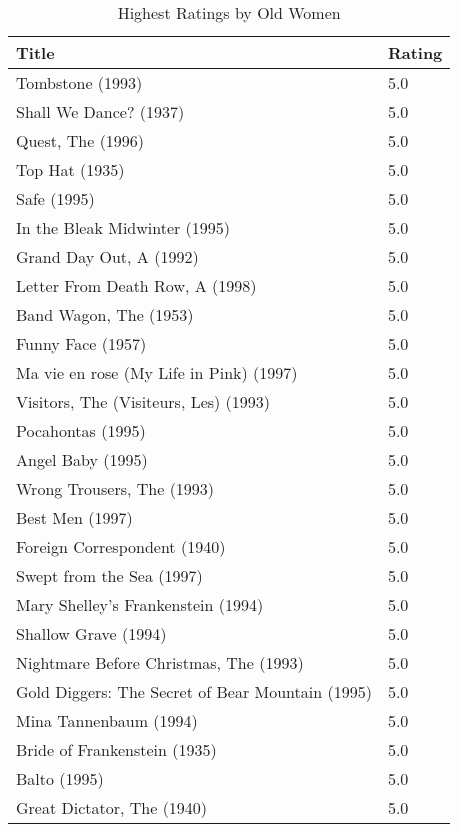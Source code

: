 \begin{table}[h!]
\centering
\begin{tabular}{| l | l |}
\hline
Title & Rating \\
\hline
Tombstone (1993) & 5.0 \\
Shall We Dance? (1937) & 5.0 \\
Quest, The (1996) & 5.0 \\
Top Hat (1935) & 5.0 \\
Safe (1995) & 5.0 \\
In the Bleak Midwinter (1995) & 5.0 \\
Grand Day Out, A (1992) & 5.0 \\
Letter From Death Row, A (1998) & 5.0 \\
Band Wagon, The (1953) & 5.0 \\
Funny Face (1957) & 5.0 \\
Ma vie en rose (My Life in Pink) (1997) & 5.0 \\
Visitors, The (Visiteurs, Les) (1993) & 5.0 \\
Pocahontas (1995) & 5.0 \\
Angel Baby (1995) & 5.0 \\
Wrong Trousers, The (1993) & 5.0 \\
Best Men (1997) & 5.0 \\
Foreign Correspondent (1940) & 5.0 \\
Swept from the Sea (1997) & 5.0 \\
Mary Shelley's Frankenstein (1994) & 5.0 \\
Shallow Grave (1994) & 5.0 \\
Nightmare Before Christmas, The (1993) & 5.0 \\
Gold Diggers: The Secret of Bear Mountain (1995) & 5.0 \\
Mina Tannenbaum (1994) & 5.0 \\
Bride of Frankenstein (1935) & 5.0 \\
Balto (1995) & 5.0 \\
Great Dictator, The (1940) & 5.0 \\
\hline
\end{tabular}
\caption{Highest Ratings by Old Women}
\label{tab:hrbow}
\end{table}

